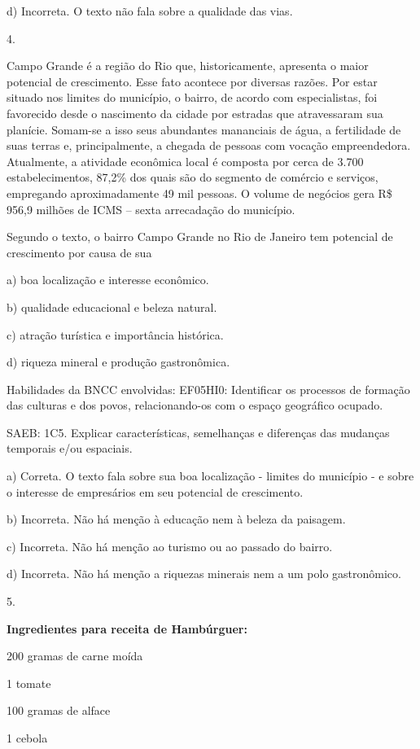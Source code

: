d) Incorreta. O texto não fala sobre a qualidade das vias.

4.

Campo Grande é a região do Rio que, historicamente, apresenta o maior
potencial de crescimento. Esse fato acontece por diversas razões. Por
estar situado nos limites do município, o bairro, de acordo com
especialistas, foi favorecido desde o nascimento da cidade por estradas
que atravessaram sua planície. Somam-se a isso seus abundantes
mananciais de água, a fertilidade de suas terras e, principalmente, a
chegada de pessoas com vocação empreendedora. Atualmente, a atividade
econômica local é composta por cerca de 3.700 estabelecimentos, 87,2\%
dos quais são do segmento de comércio e serviços, empregando
aproximadamente 49 mil pessoas. O volume de negócios gera R\$ 956,9
milhões de ICMS -- sexta arrecadação do município.

Segundo o texto, o bairro Campo Grande no Rio de Janeiro tem potencial
de crescimento por causa de sua

a) boa localização e interesse econômico.

b) qualidade educacional e beleza natural.

c) atração turística e importância histórica.

d) riqueza mineral e produção gastronômica.

Habilidades da BNCC envolvidas: EF05HI0: Identificar os processos de
formação das culturas e dos povos, relacionando-os com o espaço
geográfico ocupado.

SAEB: 1C5. Explicar características, semelhanças e diferenças das
mudanças temporais e/ou espaciais.

a) Correta. O texto fala sobre sua boa localização - limites do
município - e sobre o interesse de empresários em seu potencial de
crescimento.

b) Incorreta. Não há menção à educação nem à beleza da paisagem.

c) Incorreta. Não há menção ao turismo ou ao passado do bairro.

d) Incorreta. Não há menção a riquezas minerais nem a um polo
gastronômico.

5.

\textbf{Ingredientes para receita de Hambúrguer: }

200 gramas de carne moída

1 tomate

100 gramas de alface

1 cebola

